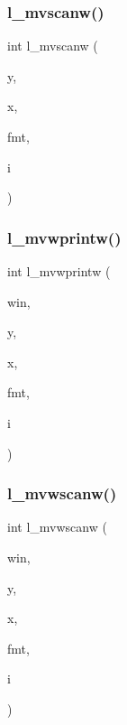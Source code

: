 \mbox{\label{C-macros_8c_a27ab41c1f51bd6ad8029350446a577ea}} 
\subsubsection{\texorpdfstring{l\+\_\+mvscanw()}{l\_mvscanw()}}
{\footnotesize\ttfamily int l\+\_\+mvscanw (\begin{DoxyParamCaption}\item[{int}]{y,  }\item[{int}]{x,  }\item[{char $\ast$}]{fmt,  }\item[{long $\ast$}]{i }\end{DoxyParamCaption})}

\mbox{\label{C-macros_8c_a5daab34ebd2f1b9e9c30e70f68b9f634}} 
\subsubsection{\texorpdfstring{l\+\_\+mvwprintw()}{l\_mvwprintw()}}
{\footnotesize\ttfamily int l\+\_\+mvwprintw (\begin{DoxyParamCaption}\item[{W\+I\+N\+D\+OW $\ast$}]{win,  }\item[{int}]{y,  }\item[{int}]{x,  }\item[{const char $\ast$}]{fmt,  }\item[{long}]{i }\end{DoxyParamCaption})}

\mbox{\label{C-macros_8c_afd4ce2c83673e3073a46a6c0e05b235b}} 
\subsubsection{\texorpdfstring{l\+\_\+mvwscanw()}{l\_mvwscanw()}}
{\footnotesize\ttfamily int l\+\_\+mvwscanw (\begin{DoxyParamCaption}\item[{W\+I\+N\+D\+OW $\ast$}]{win,  }\item[{int}]{y,  }\item[{int}]{x,  }\item[{char $\ast$}]{fmt,  }\item[{long $\ast$}]{i }\end{DoxyParamCaption})}

